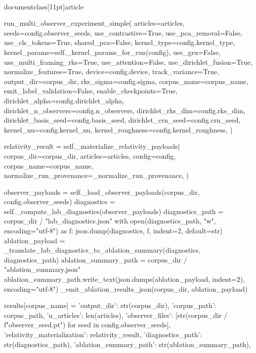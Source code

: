 \\documentclass[11pt]{article}
\begin{document}
\begin{CodeBlock}
            run_multi_observer_experiment_simple(
                articles=articles,
                seeds=config.observer_seeds,
                use_contrastive=True,
                use_pca_removal=False,
                use_cls_tokens=True,
                shared_pca=False,
                kernel_type=config.kernel_type,
                kernel_params=self._kernel_params_for_run(config),
                use_gru=False,
                use_multi_framing_rks=True,
                use_attention=False,
                use_dirichlet_fusion=True,
                normalize_features=True,
                device=config.device,
                track_variance=True,
                output_dir=corpus_dir,
                rks_sigma=config.sigma,
                corpus_name=corpus_name,
                emit_label_validation=False,
                enable_checkpoints=True,
                dirichlet_alpha=config.dirichlet_alpha,
                dirichlet_n_observers=config.n_observers,
                dirichlet_rks_dim=config.rks_dim,
                dirichlet_basis_seed=config.basis_seed,
                dirichlet_crn_seed=config.crn_seed,
                kernel_nu=config.kernel_nu,
                kernel_roughness=config.kernel_roughness,
            )

            relativity_result = self._materialize_relativity_payloads(
                corpus_dir=corpus_dir,
                articles=articles,
                config=config,
                corpus_name=corpus_name,
                normalize_run_provenance=_normalize_run_provenance,
            )

            observer_payloads = self._load_observer_payloads(corpus_dir, config.observer_seeds)
            diagnostics = self._compute_lab_diagnostics(observer_payloads)
            diagnostics_path = corpus_dir / "lab_diagnostics.json"
            with open(diagnostics_path, "w", encoding="utf-8") as f:
                json.dump(diagnostics, f, indent=2, default=str)
            ablation_payload = _translate_lab_diagnostics_to_ablation_summary(diagnostics, diagnostics_path)
            ablation_summary_path = corpus_dir / "ablation_summary.json"
            ablation_summary_path.write_text(json.dumps(ablation_payload, indent=2), encoding="utf-8")
            _emit_ablation_results_json(corpus_dir, ablation_payload)

            results[corpus_name] = {
                'output_dir': str(corpus_dir),
                'corpus_path': corpus_path,
                'n_articles': len(articles),
                'observer_files': [str(corpus_dir / f"observer_{seed}.pt") for seed in config.observer_seeds],
                'relativity_materialization': relativity_result,
                'diagnostics_path': str(diagnostics_path),
                'ablation_summary_path': str(ablation_summary_path),
            }


\end{CodeBlock}
\end{document}
